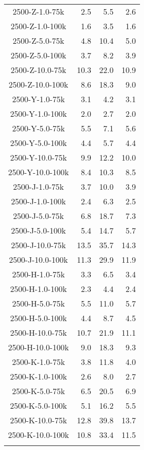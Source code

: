 \begin{longtable}{crrr}
    2500-Z-1.0-75k &   2.5 &    5.5 &   2.6 \\
    2500-Z-1.0-100k &   1.6 &    3.5 &   1.6 \\
    2500-Z-5.0-75k &   4.8 &   10.4 &   5.0 \\
    2500-Z-5.0-100k &   3.7 &    8.2 &   3.9 \\
    2500-Z-10.0-75k &  10.3 &   22.0 &  10.9 \\
    2500-Z-10.0-100k &   8.6 &   18.3 &   9.0 \\
    2500-Y-1.0-75k &   3.1 &    4.2 &   3.1 \\
    2500-Y-1.0-100k &   2.0 &    2.7 &   2.0 \\
    2500-Y-5.0-75k &   5.5 &    7.1 &   5.6 \\
    2500-Y-5.0-100k &   4.4 &    5.7 &   4.4 \\
    2500-Y-10.0-75k &   9.9 &   12.2 &  10.0 \\
    2500-Y-10.0-100k &   8.4 &   10.3 &   8.5 \\
    2500-J-1.0-75k &   3.7 &   10.0 &   3.9 \\
    2500-J-1.0-100k &   2.4 &    6.3 &   2.5 \\
    2500-J-5.0-75k &   6.8 &   18.7 &   7.3 \\
    2500-J-5.0-100k &   5.4 &   14.7 &   5.7 \\
    2500-J-10.0-75k &  13.5 &   35.7 &  14.3 \\
    2500-J-10.0-100k &  11.3 &   29.9 &  11.9 \\
    2500-H-1.0-75k &   3.3 &    6.5 &   3.4 \\
    2500-H-1.0-100k &   2.3 &    4.4 &   2.4 \\
    2500-H-5.0-75k &   5.5 &   11.0 &   5.7 \\
    2500-H-5.0-100k &   4.4 &    8.7 &   4.5 \\
    2500-H-10.0-75k &  10.7 &   21.9 &  11.1 \\
    2500-H-10.0-100k &   9.0 &   18.3 &   9.3 \\
    2500-K-1.0-75k &   3.8 &   11.8 &   4.0 \\
    2500-K-1.0-100k &   2.6 &    8.0 &   2.7 \\
    2500-K-5.0-75k &   6.5 &   20.5 &   6.9 \\
    2500-K-5.0-100k &   5.1 &   16.2 &   5.5 \\
    2500-K-10.0-75k &  12.8 &   39.8 &  13.7 \\
    2500-K-10.0-100k &  10.8 &   33.4 &  11.5 \\
    \label{tab:spirou_precisions}
\end{longtable}



